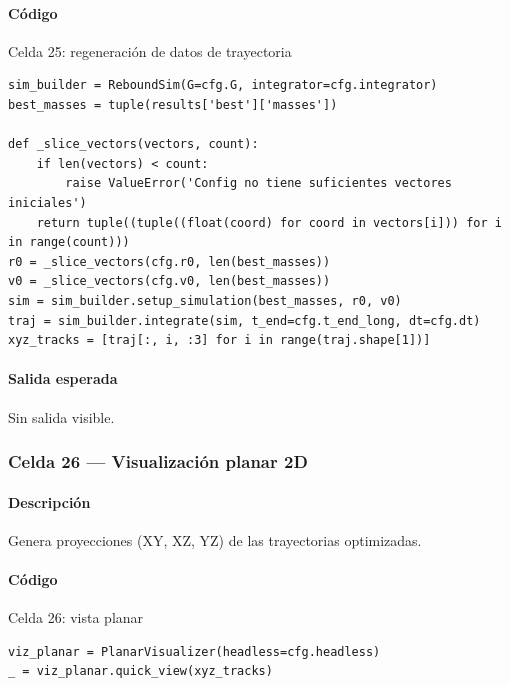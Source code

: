 \paragraph{Código}
\par\smallskip
\begin{listing}[H]
\caption{Celda 25: regeneración de datos de trayectoria}
\begin{adjustbox}{max width=\textwidth}
\begin{minipage}{\textwidth}
\begin{verbatim}
sim_builder = ReboundSim(G=cfg.G, integrator=cfg.integrator)
best_masses = tuple(results['best']['masses'])

def _slice_vectors(vectors, count):
    if len(vectors) < count:
        raise ValueError('Config no tiene suficientes vectores iniciales')
    return tuple((tuple((float(coord) for coord in vectors[i])) for i in range(count)))
r0 = _slice_vectors(cfg.r0, len(best_masses))
v0 = _slice_vectors(cfg.v0, len(best_masses))
sim = sim_builder.setup_simulation(best_masses, r0, v0)
traj = sim_builder.integrate(sim, t_end=cfg.t_end_long, dt=cfg.dt)
xyz_tracks = [traj[:, i, :3] for i in range(traj.shape[1])]
\end{verbatim}
\end{minipage}
\end{adjustbox}
\end{listing}
\paragraph{Salida esperada} Sin salida visible.

\subsubsection*{Celda 26 — Visualización planar 2D}
\paragraph{Descripción} Genera proyecciones (XY, XZ, YZ) de las trayectorias optimizadas.
\paragraph{Código}
\par\smallskip
\begin{listing}[H]
\caption{Celda 26: vista planar}
\begin{adjustbox}{max width=\textwidth}
\begin{minipage}{\textwidth}
\begin{verbatim}
viz_planar = PlanarVisualizer(headless=cfg.headless)
_ = viz_planar.quick_view(xyz_tracks)
\end{verbatim}
\end{minipage}
\end{adjustbox}
\end{listing}
